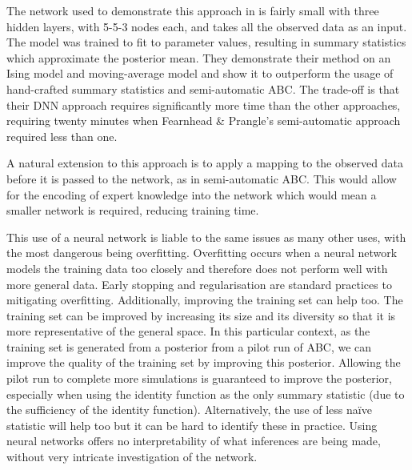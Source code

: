\documentclass[bibliography=totoc,11pt,a4paper,margin=0]{article}
\theoremstyle{break}
\begin{document}
  \par The network used to demonstrate this approach in \cite[]{learning_summary_statistics_for_abc_via_dnn} is fairly small with three hidden layers, with 5-5-3 nodes each, and takes all the observed data as an input. The model was trained to fit to parameter values, resulting in summary statistics which approximate the posterior mean. They demonstrate their method on an Ising model and moving-average model and show it to outperform the usage of hand-crafted summary statistics and semi-automatic ABC. The trade-off is that their DNN approach requires significantly more time than the other approaches, requiring twenty minutes when Fearnhead \& Prangle's semi-automatic approach required less than one.

  \par A natural extension to this approach is to apply a mapping to the observed data before it is passed to the network, as in semi-automatic ABC. This would allow for the encoding of expert knowledge into the network which would mean a smaller network is required, reducing training time.

  \par This use of a neural network is liable to the same issues as many other uses, with the most dangerous being overfitting. Overfitting occurs when a neural network models the training data too closely and therefore does not perform well with more general data. Early stopping and regularisation are standard practices to mitigating overfitting. Additionally, improving the training set can help too. The training set can be improved by increasing its size and its diversity so that it is more representative of the general space. In this particular context, as the training set is generated from a posterior from a pilot run of ABC, we can improve the quality of the training set by improving this posterior. Allowing the pilot run to complete more simulations is guaranteed to improve the posterior, especially when using the identity function as the only summary statistic (due to the sufficiency of the identity function). Alternatively, the use of less na\"ive statistic will help too but it can be hard to identify these in practice. Using neural networks offers no interpretability of what inferences are being made, without very intricate investigation of the network.


\end{document}
